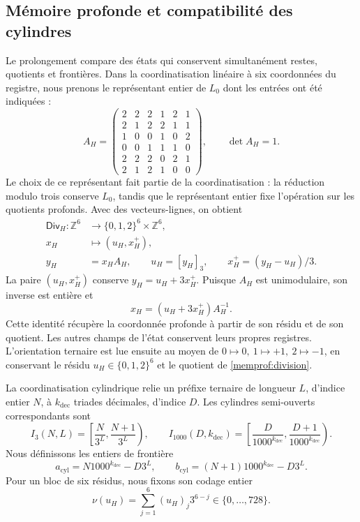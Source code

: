 \subsection{Mémoire profonde et compatibilité des cylindres}
\label{memprof:seccion}

Le prolongement compare des états qui conservent simultanément restes,
quotients et frontières. Dans la coordinatisation linéaire à six coordonnées du registre,
nous prenons le représentant entier de \(L_0\) dont les entrées ont été indiquées :
\[
 A_H=\begin{pmatrix}
 2&2&2&1&2&1\\2&1&2&2&1&1\\1&0&0&1&0&2\\
 0&0&1&1&1&0\\2&2&2&0&2&1\\2&1&2&1&0&0
 \end{pmatrix},\qquad\det A_H=1.
\]
Le choix de ce représentant fait partie de la coordinatisation : la réduction
modulo trois conserve \(L_0\), tandis que le représentant entier fixe
l'opération sur les quotients profonds. Avec des vecteurs-lignes, on obtient
\begin{equation}
 \begin{aligned}
 \mathsf{Div}_H:\mathbb Z^6&\longrightarrow
       \{0,1,2\}^6\times\mathbb Z^6,\\
 x_H&\longmapsto(u_H,x_H^+),\\
 y_H&=x_HA_H,\qquad u_H=[y_H]_3,\qquad
 x_H^+=(y_H-u_H)/3 .
 \end{aligned}
 \label{memprof:division}
\end{equation}
La paire \((u_H,x_H^+)\) conserve \(y_H=u_H+3x_H^+\). Puisque \(A_H\) est unimodulaire, son inverse est entière et
\begin{equation}
 x_H=(u_H+3x_H^+)A_H^{-1}.
 \label{memprof:inversa}
\end{equation}
Cette identité récupère la coordonnée profonde à partir de son résidu et de son quotient. Les autres champs de l'état conservent leurs propres registres. L'orientation ternaire est lue ensuite au moyen de \(0\mapsto0,\ 1\mapsto+1,\ 2\mapsto-1\), en conservant le résidu \(u_H\in\{0,1,2\}^6\) et le quotient de \eqref{memprof:division}.

La coordinatisation cylindrique relie un préfixe ternaire de longueur \(L\),
d'indice entier \(N\), à \(k_{\mathrm{dec}}\) triades décimales,
d'indice \(D\). Les cylindres semi-ouverts correspondants sont
\[
 I_3(N,L)=\left[\frac N{3^L},\frac{N+1}{3^L}\right),\qquad
 I_{1000}(D,k_{\mathrm{dec}})
 =\left[\frac D{1000^{k_{\mathrm{dec}}}},
         \frac{D+1}{1000^{k_{\mathrm{dec}}}}\right).
\]
Nous définissons les entiers de frontière
\[
 a_{\mathrm{cyl}}=N1000^{k_{\mathrm{dec}}}-D3^L,\qquad
 b_{\mathrm{cyl}}=(N+1)1000^{k_{\mathrm{dec}}}-D3^L.
\]
Pour un bloc de six résidus, nous fixons son codage entier
\[
 \nu(u_H)=\sum_{j=1}^6(u_H)_j3^{6-j}
 \in\{0,\ldots,728\}.
\]

